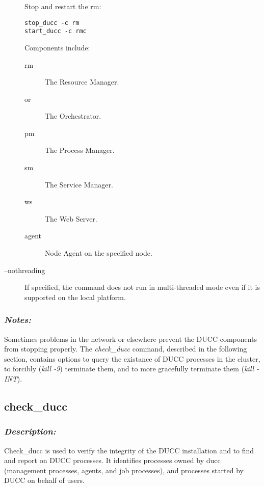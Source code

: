 \begin{description}
            Stop and restart the rm: 
\begin{verbatim}
stop_ducc -c rm 
start_ducc -c rmc 
\end{verbatim}
            
            Components include: 
            \begin{description}
              \item[rm] The Resource Manager.                 
              \item[or] The Orchestrator.                 
              \item[pm] The Process Manager.                 
              \item[sm] The Service Manager.                 
              \item[ws] The Web Server.                 
              \item[agent\@node] Node Agent on the specified node.
              \end{description}

          \item[--nothreading] If specified, the command does not run in multi-threaded mode
            even if it is supported on the local platform.
              
       \end{description}
            
   \subsubsection{{\em Notes:}}
   Sometimes problems in the network or elsewhere prevent the DUCC components from stopping properly.  The
   {\em check\_ducc} command, described in the following section, contains options to query the
   existance of DUCC processes in the cluster, to forcibly ({\em kill -9}) terminate them, and to
   more gracefully terminate them ({\em kill -INT}).
          


\subsection{check\_ducc}
\label{subsec:admin.check-ducc}
    \subsubsection{{\em Description:}}

    Check\_ducc is used to verify the integrity of the DUCC installation and to find and report on
    DUCC processes. It identifies processes owned by ducc (management processes, agents,
    and job processes), and processes started by DUCC on behalf of users.
    
